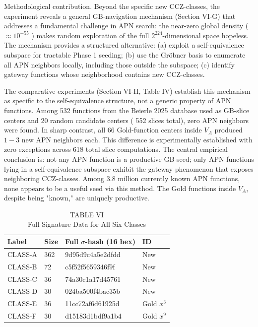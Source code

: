 \documentclass[10pt]{article}
\begin{document}
Methodological contribution. Beyond the specific new CCZ-classes, the experiment reveals a general GB-navigation mechanism (Section VI-G) that addresses a fundamental challenge in APN search: the near-zero global density ( $\approx 10^{-55}$ ) makes random exploration of the full $2^{224}$-dimensional space hopeless. The mechanism provides a structured alternative: (a) exploit a self-equivalence subspace for tractable Phase 1 seeding; (b) use the Gröbner basis to enumerate all APN neighbors locally, including those outside the subspace; (c) identify gateway functions whose neighborhood contains new CCZ-classes.

The comparative experiments (Section VI-H, Table IV) establish this mechanism as specific to the self-equivalence structure, not a generic property of APN functions. Among 532 functions from the Beierle 2025 database used as GB-slice centers and 20 random candidate centers ( 552 slices total), zero APN neighbors were found. In sharp contrast, all 66 Gold-function centers inside $V_{A}$ produced $1-3$ new APN neighbors each. This difference is experimentally established with zero exceptions across 618 total slice computations. The central empirical conclusion is: not any APN function is a productive GB-seed; only APN functions lying in a self-equivalence subspace exhibit the gateway phenomenon that exposes neighboring CCZ-classes. Among 3.8 million currently known APN functions, none appears to be a useful seed via this method. The Gold functions inside $V_{A}$, despite being "known," are uniquely productive.

\begin{table}[h]
\begin{center}
\captionsetup{labelformat=empty}
\caption{TABLE VI\\
Full Signature Data for All Six Classes}
\begin{tabular}{|l|l|l|l|}
\hline
Label & Size & Full $\sigma$-hash (16 hex) & ID \\
\hline
CLASS-A & 362 & 9d95d9c4a5e2dfdd & New \\
\hline
CLASS-B & 72 & c5f52f5659346f9f & New \\
\hline
CLASS-C & 36 & 74a30c1a17d45761 & New \\
\hline
CLASS-D & 30 & 024ba500f4bac35b & New \\
\hline
CLASS-E & 36 & 11cc72af6d61925d & Gold $x^{3}$ \\
\hline
CLASS-F & 30 & d15183d1bdf9a1b4 & Gold $x^{9}$ \\
\hline
\end{tabular}
\end{center}
\end{table}
\end{document}
